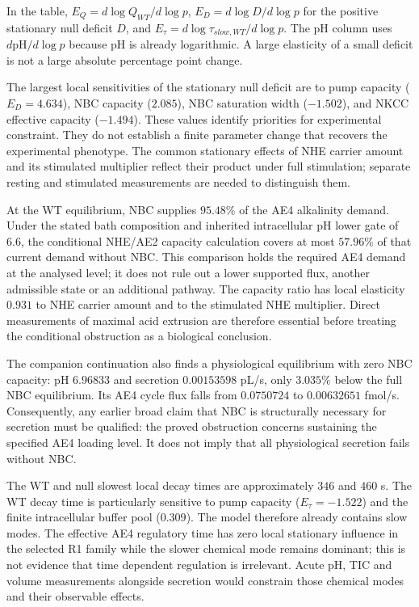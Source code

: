 \documentclass[11pt,a4paper]{article}
\begin{document}
In the table, $E_Q=d\log Q_{WT}/d\log p$, $E_D=d\log D/d\log p$ for the positive stationary null deficit $D$, and $E_{\tau}=d\log\tau_{slow,WT}/d\log p$. The pH column uses $d\mathrm{pH}/d\log p$ because pH is already logarithmic. A large elasticity of a small deficit is not a large absolute percentage point change.


The largest local sensitivities of the stationary null deficit are to pump capacity ($E_D=4.634$), NBC capacity ($2.085$), NBC saturation width ($-1.502$), and NKCC effective capacity ($-1.494$). These values identify priorities for experimental constraint. They do not establish a finite parameter change that recovers the experimental phenotype. The common stationary effects of NHE carrier amount and its stimulated multiplier reflect their product under full stimulation; separate resting and stimulated measurements are needed to distinguish them.

At the WT equilibrium, NBC supplies $95.48\%$ of the AE4 alkalinity demand. Under the stated bath composition and inherited intracellular pH lower gate of 6.6, the conditional NHE/AE2 capacity calculation covers at most $57.96\%$ of that current demand without NBC. This comparison holds the required AE4 demand at the analysed level; it does not rule out a lower supported flux, another admissible state or an additional pathway. The capacity ratio has local elasticity $0.931$ to NHE carrier amount and to the stimulated NHE multiplier. Direct measurements of maximal acid extrusion are therefore essential before treating the conditional obstruction as a biological conclusion.

The companion continuation also finds a physiological equilibrium with zero NBC capacity: pH $6.96833$ and secretion $0.00153598$ pL/s, only $3.035\%$ below the full NBC equilibrium. Its AE4 cycle flux falls from $0.0750724$ to $0.00632651$ fmol/s. Consequently, any earlier broad claim that NBC is structurally necessary for secretion must be qualified: the proved obstruction concerns sustaining the specified AE4 loading level. It does not imply that all physiological secretion fails without NBC.

The WT and null slowest local decay times are approximately $346$ and $460$ s. The WT decay time is particularly sensitive to pump capacity ($E_{\tau}=-1.522$) and the finite intracellular buffer pool ($0.309$). The model therefore already contains slow modes. The effective AE4 regulatory time has zero local stationary influence in the selected R1 family while the slower chemical mode remains dominant; this is not evidence that time dependent regulation is irrelevant. Acute pH, TIC and volume measurements alongside secretion would constrain those chemical modes and their observable effects.
\end{document}
